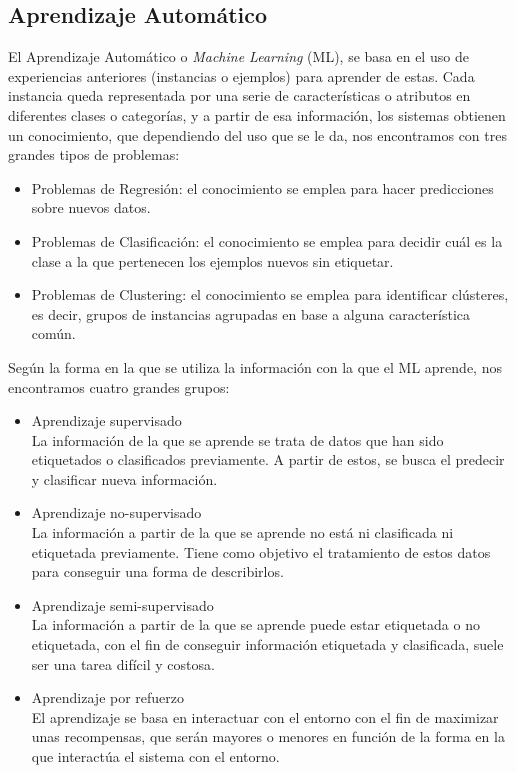 \subsection{Aprendizaje Automático}
El Aprendizaje Automático o \textit{Machine Learning} (ML), se basa en el uso de experiencias anteriores (instancias o ejemplos) para aprender de estas.
Cada instancia queda representada por una serie de características o atributos en diferentes clases o categorías,
y a partir de esa información, los sistemas obtienen un conocimiento, que dependiendo del uso que se le da, nos encontramos con tres grandes tipos de problemas:
\begin{itemize}
    \item Problemas de Regresión: el conocimiento se emplea para hacer predicciones sobre nuevos datos.
    \item Problemas de Clasificación: el conocimiento se emplea para decidir cuál es la clase a la que pertenecen los ejemplos nuevos sin etiquetar.
    \item Problemas de Clustering: el conocimiento se emplea para identificar clústeres, es decir, grupos de instancias agrupadas en base a alguna característica común.
\end{itemize} 

Según la forma en la que se utiliza la información con la que el ML aprende, nos encontramos cuatro grandes grupos:
\begin{itemize}
    \item Aprendizaje supervisado\\
    La información de la que se aprende se trata de datos que han sido etiquetados o clasificados previamente.
    A partir de estos, se busca el predecir y clasificar nueva información.
    \item Aprendizaje no-supervisado\\
    La información a partir de la que se aprende no está ni clasificada ni etiquetada previamente. 
    Tiene como objetivo el tratamiento de estos datos para conseguir una forma de describirlos.
    \item Aprendizaje semi-supervisado\\
    La información a partir de la que se aprende puede estar etiquetada o no etiquetada, 
    con el fin de conseguir información etiquetada y clasificada, suele ser una tarea difícil y costosa.
    \item Aprendizaje por refuerzo\\
    El aprendizaje se basa en interactuar con el entorno con el fin de maximizar unas recompensas,
    que serán mayores o menores en función de la forma en la que interactúa el sistema con el entorno. 
\end{itemize}

